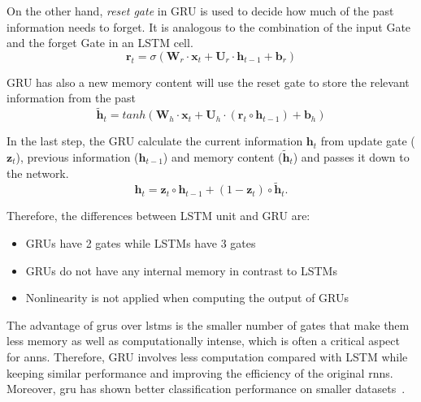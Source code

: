 On the other hand, \textit{reset gate} in GRU is used to decide how much of the past information needs to forget. It is analogous to the combination of the input Gate and the forget Gate in an LSTM cell.
\begin{equation}
\mathbf{r}_t = \sigma \left(\mathbf{W}_r \cdot \mathbf{x}_t + \mathbf{U}_r \cdot \mathbf{h}_{t-1} + \mathbf{b}_r\right)
\end{equation}

GRU has also a new memory content will use the reset gate to store the relevant information from the past
\begin{equation}
\mathbf{\tilde h}_t = tanh \left(\mathbf{W}_h \cdot \mathbf{x}_t + \mathbf{U}_h \cdot (\mathbf{r}_t \circ \mathbf{h}_{t-1}) + \mathbf{b}_h\right)
\end{equation}

In the last step, the GRU calculate the current information $\mathbf{h}_t$ from update gate ($\mathbf{z}_t$), previous information ($\mathbf{h}_{t-1}$) and memory content ($\mathbf{\tilde h}_t$) and passes it down to the network. 
\begin{equation}
\mathbf{h}_t = \mathbf{z}_t \circ \mathbf{h}_{t-1} + (1 - \mathbf{z}_t) \circ \mathbf{\tilde h}_t.
\end{equation}

Therefore, the differences between LSTM unit and GRU are:
\begin{itemize}
	\item GRUs have 2 gates while LSTMs have 3 gates
	\item GRUs do not have any internal memory in contrast to LSTMs
	\item Nonlinearity is not applied when computing the output of GRUs
\end{itemize}

The advantage of \gls{gru}s over \gls{lstm}s is the smaller number of gates that make them less memory as well as computationally intense, which is often a critical aspect for \gls{ann}s. Therefore, GRU involves less computation compared with LSTM while keeping similar performance and improving the efficiency of the original \gls{rnn}s. Moreover, \gls{gru} has shown better classification performance on smaller datasets~\cite{Chung_14}.

